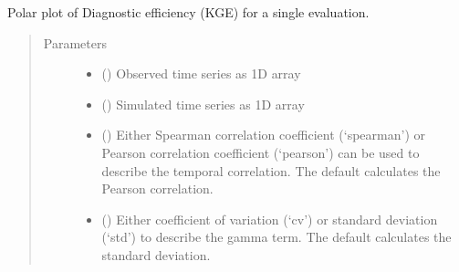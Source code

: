 \documentclass[letterpaper,10pt,english]{sphinxmanual}
\begin{document}
\begin{fulllineitems}
\label{\detokenize{reference/kge:de.kge.polar_plot}}
Polar plot of Diagnostic efficiency (KGE) for a single
evaluation.
\begin{quote}\begin{description}
\item[{Parameters}] \leavevmode\begin{itemize}
\item {} 
 (\sphinxstyleliteralemphasis{\sphinxupquote{(}}\sphinxstyleliteralemphasis{\sphinxupquote{,}}\sphinxstyleliteralemphasis{\sphinxupquote{)}}) \textendash{} Observed time series as 1\sphinxhyphen{}D array

\item {} 
 (\sphinxstyleliteralemphasis{\sphinxupquote{(}}\sphinxstyleliteralemphasis{\sphinxupquote{,}}\sphinxstyleliteralemphasis{\sphinxupquote{)}}) \textendash{} Simulated time series as 1\sphinxhyphen{}D array

\item {} 
 (\sphinxstyleliteralemphasis{\sphinxupquote{, }}) \textendash{} Either Spearman correlation coefficient (‘spearman’) or Pearson
correlation coefficient (‘pearson’) can be used to describe the
temporal correlation. The default calculates the Pearson correlation.

\item {} 
 (\sphinxstyleliteralemphasis{\sphinxupquote{, }}) \textendash{} Either coefficient of variation (‘cv’) or standard deviation (‘std’)
to describe the gamma term. The default calculates the standard
deviation.


\end{itemize}
\end{description}
\end{quote}
\end{fulllineitems}
\end{document}
